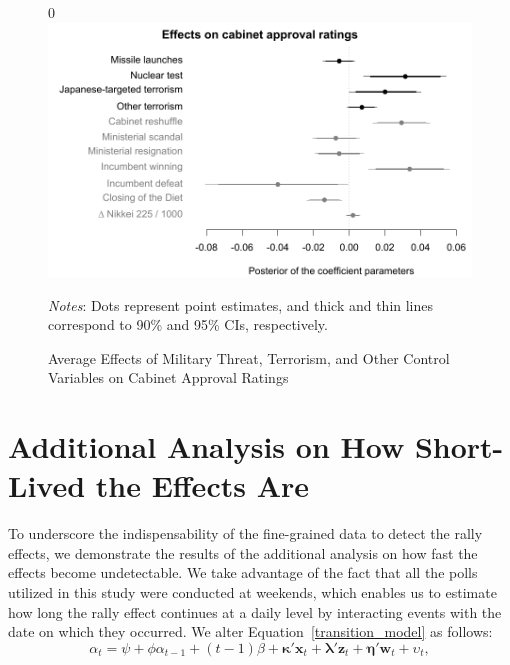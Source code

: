 \documentclass[letterpaper,12pt]{scrartcl}
\newcommand{\counting}{0}
\begin{document}
\begin{figure}[!t]
\begin{minipage}{\hsize}
\centering
\singlespacing
\if\counting0
\includegraphics[scale=1]{Figure_JCR/average_effect_on_cabinet_approval.pdf}
\fi
\caption{Average Effects of Military Threat, Terrorism, and Other Control Variables on Cabinet Approval Ratings}
\label{average_effect_on_cabinet_approval}
\end{minipage}
\begin{minipage}{\hsize}
\singlespacing
\small
\emph{Notes}: Dots represent point estimates, and thick and thin lines correspond to 90\% and 95\% CIs, respectively.
\end{minipage}
\end{figure}

\section*{Additional Analysis on How Short-Lived the Effects Are}

To underscore the indispensability of the fine-grained data to detect the rally effects, we demonstrate the results of the additional analysis on how fast the effects become undetectable. We take advantage of the fact that all the polls utilized in this study were conducted at weekends, which enables us to estimate how long the rally effect continues at a daily level by interacting events with the date on which they occurred. We alter Equation~\eqref{transition_model} as follows:
\begin{equation}
\alpha _{t}=\psi + \phi \alpha _{t-1}+(t-1)\beta +\bm{\kappa}'\bm{x}_{t}+\bm{\lambda}'\bm{z}_{t}+\bm{\eta}'\bm{w}_{t}+\upsilon _{t},\label{transition_model_2}
\end{equation}
\end{document}
